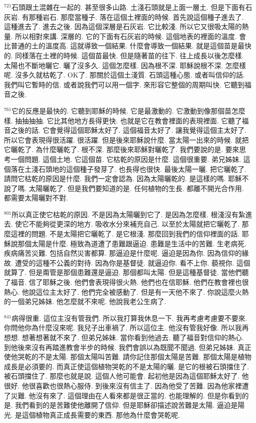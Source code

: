 \documentclass{book}
\begin{document}
$^{721}$石頭跟土混雜在一起的.
甚至很多山路.
土淺石頭就是上面一層土.
但是下面有石灰岩.
有那種岩石.
那麼當種子.
落在這個土裡面的時候.
首先說這個種子進去了.
這種進去了.
進去之後.
因為這個深層是石灰岩.
它比較淺.
所以它又很吸太陽的熱量.
所以相對來講.
深層的.
它的下面有石灰岩的時候.
這個地表的裡面的溫度.
會比普通的土的溫度高.
這就導致一個結果.
什麼會導致一個結果.
就是這個苗是最快的.
同樣落在土裡的時候.
這個苗最快.
但是隨著苗的往下.
往上成長以後怎麼樣.
太陽也不斷地曬它.
曬了沒多久.
這個怎麼樣.
因為根不深.
耶穌說根不深.
怎麼樣呢.
沒多久就枯乾了.
OK了.
那關於這個土淺質.
石頭這種心態.
或者叫信仰的話.
我們叫它暫時的信.
或者說我們可以用一個字.
來形容它整個的周期叫快.
它聽到福音之後.

$^{761}$它的反應是最快的.
它聽到耶穌的時候.
它是最激動的.
它激動到像那個苗怎麼樣.
抽抽抽抽.
它比其他地方長得更快.
也就是它在教會裡面的表現裡面.
它聽了福音之後的話.
它會覺得這個耶穌太好了.
這個福音太好了.
讓我覺得這個主太好了.
所以它會表現得很活躍.
很活躍.
但是後來耶穌說什麼.
當太陽一出來的時候.
就把它曬乾了.
為什麼曬乾了.
根不深.
那麼後來耶穌對曬乾了.
我們要說的是.
要來思考一個問題.
這個土地.
它這個苗.
它枯乾的原因是什麼.
這個很重要.
弟兄姊妹.
這個落在土淺石頭地的這個種子發芽了.
也長得也很快.
最後太陽一曬.
把它曬乾了.
請問它枯乾的原因是什麼.
我們一定會認為.
因為太陽曬乾的.
是這樣的嗎.
耶穌不說了嗎.
太陽曬乾了.
但是我們要知道的是.
任何植物的生長.
都離不開光合作用.
都需要太陽曬對不對.

$^{801}$所以真正使它枯乾的原因.
不是因為太陽曬到它了.
是因為怎麼樣.
根淺沒有紮進去.
使它不能夠從更深的地方.
吸收水分來補充自己.
以至於太陽就把它曬乾了.
那麼這裡的問題.
不是太陽把它曬乾了.
是它根淺.
那麼回到我們的信仰裡面的話.
耶穌說那個太陽是什麼.
極致為道遭了患難跟逼迫.
患難是生活中的苦難.
生老病死.
疾病痛苦災難.
包括自然災害都算.
那逼迫是什麼呢.
逼迫是因為你.
因為信仰的緣故.
遭受的這種不公義的對待.
因為你是基督徒.
就逼迫你.
看不上你.
藐視你.
這個就算了.
但是甭管是那個患難還是逼迫.
那個都叫太陽.
但是這種基督徒.
當他們聽了福音.
信了耶穌之後.
他們會表現得很火熱.
他們也在信耶穌.
他們在教會裡也很熱心.
他說這位主太好了.
他們完全被感動了.
但是有一天他不來了.
你說這麼火熱的一個弟兄姊妹.
他怎麼就不來呢.
他說我老公生病了.

$^{841}$病得很重.
這位主沒有管我們.
所以我打算我休息一下.
我再考慮考慮要不要來.
你問他你為什麼沒來呢.
我兒子出車禍了.
所以這位主.
他沒有管我好像.
所以我再想想.
想著想著就不來了.
但弟兄姊妹.
當你看到他過去.
聽了福音對信仰的熱心.
到他後來沒有再踏進教會半步的時候.
我們會誤以為既聞不聞過.
但弟兄姊妹.
真正使他哭乾的不是太陽.
那個太陽叫苦難.
請你記住那個太陽是苦難.
那個太陽是植物成長是必須要的.
而真正使這個植物哭乾的不是太陽的曬.
是它的根被石頭擋住了.
被石頭擋住了.
那麼也就是說.
這個人他可能會.
起初他是因為這個耶穌太好了.
他很好.
他很喜歡也很熱心服侍.
到後來沒有信主了.
因為他受了苦難.
因為他家裡遭了災難.
他沒有來了.
這個理由在人看來都是很正當的.
也能理解的.
但是你看到的是.
我們看到的是苦難使他離開了信仰.
但是耶穌卻描述說苦難是太陽.
逼迫是陽光.
是這個植物真正成長需要的東西.
那他為什麼會哭乾呢.
\end{document}
